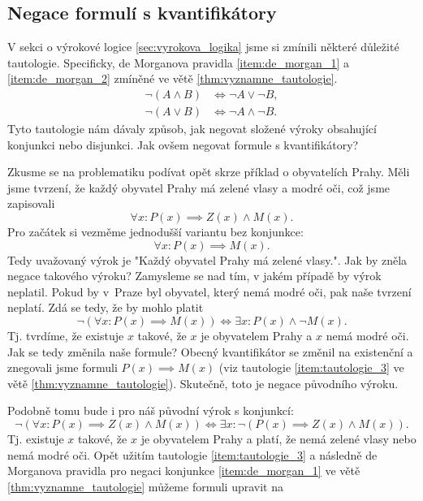 \subsection{Negace formulí s kvantifikátory}
V sekci o výrokové logice \ref{sec:vyrokova_logika} jsme si zmínili některé důležité tautologie. Specificky, de Morganova pravidla \ref{item:de_morgan_1} a \ref{item:de_morgan_2} zmíněné ve větě \ref{thm:vyznamne_tautologie}.
\begin{align*}
    \neg (A \land B) &\iff \neg A \lor \neg B,\\
    \neg (A \lor B) &\iff \neg A \land \neg B.
\end{align*}
Tyto tautologie nám dávaly způsob, jak negovat složené výroky obsahující konjunkci nebo disjunkci. Jak ovšem negovat formule s kvantifikátory?\par
Zkusme se na problematiku podívat opět skrze příklad o obyvatelích Prahy. Měli jsme tvrzení, že každý obyvatel Prahy má zelené vlasy a modré oči, což jsme zapisovali
\begin{equation*}
    \forall x : P(x)\implies Z(x) \land M(x).
\end{equation*}
Pro začátek si vezměme jednodušší variantu bez konjunkce:
\begin{equation*}
    \forall x : P(x)\implies M(x).
\end{equation*}
Tedy uvažovaný výrok je "Každý obyvatel Prahy má zelené vlasy.". Jak by zněla negace takového výroku? Zamysleme se nad tím, v jakém případě by výrok neplatil. Pokud by v~Praze byl obyvatel, který nemá modré oči, pak naše tvrzení neplatí. Zdá se tedy, že by mohlo platit
\begin{equation*}
    \neg(\forall x : P(x)\implies M(x)) \iff \exists x: P(x) \land \neg M(x).
\end{equation*}
Tj. tvrdíme, že existuje $x$ takové, že $x$ je obyvatelem Prahy a $x$ nemá modré oči. Jak se tedy změnila naše formule? Obecný kvantifikátor se změnil na existenční a znegovali jsme formuli $P(x)\implies M(x)$ (viz tautologie \ref{item:tautologie_3} ve větě \ref{thm:vyznamne_tautologie}). Skutečně, toto je negace původního výroku.\par
Podobně tomu bude i pro náš původní výrok s konjunkcí:
\begin{equation*}
    \neg(\forall x : P(x)\implies Z(x) \land M(x)) \iff \exists x : \neg (P(x)\implies Z(x) \land M(x)).
\end{equation*}
Tj. existuje $x$ takové, že $x$ je obyvatelem Prahy a platí, že nemá zelené vlasy nebo nemá modré oči. Opět užitím tautologie \ref{item:tautologie_3} a následně de Morganova pravidla pro negaci konjunkce \ref{item:de_morgan_1} ve větě \ref{thm:vyznamne_tautologie} můžeme formuli upravit na

